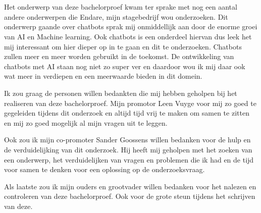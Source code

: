 
\chapter*{}
\label{ch:voorwoord}


Het onderwerp van deze bachelorproef kwam ter sprake met nog een aantal andere onderwerpen die Endare, mijn stagebedrijf wou onderzoeken. Dit onderwerp gaande over chatbots sprak mij onmiddellijk aan door de enorme groei van AI en Machine learning. Ook chatbots is een onderdeel hiervan dus leek het mij interessant om hier dieper op in te gaan en dit te onderzoeken. Chatbots zullen meer en meer worden gebruikt in de toekomst. De ontwikkeling van chatbots met AI staan nog niet zo super ver en daardoor wou ik mij daar ook wat meer in verdiepen en een meerwaarde bieden in dit domein.

Ik zou graag de personen willen bedankten die mij hebben geholpen bij het realiseren van deze bachelorproef. Mijn promotor Leen Vuyge voor mij zo goed te gegeleiden tijdens dit onderzoek en altijd tijd vrij te maken om samen te zitten en mij zo goed mogelijk al mijn vragen uit te leggen.

Ook zou ik mijn co-promoter Sander Goossens willen bedanken voor de hulp en de verduidelijking van dit onderzoek. Hij heeft mij geholpen met het zoeken van een onderwerp, het verduidelijken van vragen en problemen die ik had en de tijd voor samen te denken voor een oplossing op de onderzoeksvraag.

Als laatste zou ik mijn ouders en grootvader willen bedanken voor het nalezen en controleren van deze bachelorproef. Ook voor de grote steun tijdens het schrijven van deze.

